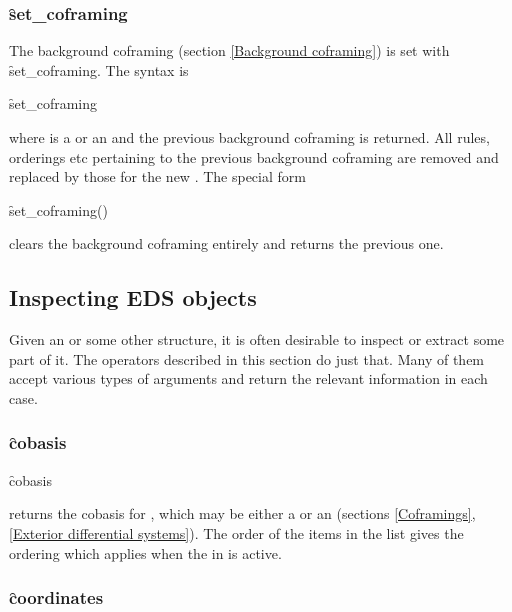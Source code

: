 \subsubsection{\f{set\_coframing}}
\label{set_coframing}

\hypertarget{operator:SET_COFRAMING}{}
The background coframing (section \ref{Background coframing}) is set with
\f{set\_coframing}. The syntax is
\begin{syntax}
   \f{set\_coframing} 
\end{syntax}
where  is a  or an  and the previous
background coframing is returned. All rules, orderings etc pertaining to the
previous background coframing are removed and replaced by those for the new
. The special form
\begin{syntax}
   \f{set\_coframing}()
\end{syntax}
clears the background coframing entirely and returns the previous one.



\subsection{Inspecting EDS objects}
\label{Inspecting EDS objects}

Given an  or some other  structure, it is often desirable to
inspect or extract some part of it. The operators described in this section
do just that. Many of them accept various types of arguments and return the
relevant information in each case.

\subsubsection{\f{cobasis}}
\label{cobasis}

\hypertarget{operator:COBASIS}{}
\begin{syntax}
	\f{cobasis} 
\end{syntax}
returns the cobasis for , which may be either a 
or an  (sections \ref{Coframings}, \ref{Exterior differential
systems}). The order of the items in the list gives the 
ordering which applies when the  in  is active.

\subsubsection{\f{coordinates}}
\label{coordinates}


